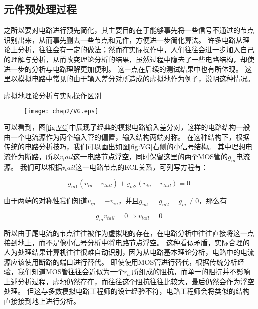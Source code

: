\subsection{元件预处理过程}
\label{subsec:simp:alg:pre}

之所以要对电路进行预先简化，其主要目的在于能够事先将一些信号不通过的节点识别出来，从而事先删去一些节点和元件，方便进一步简化算法。
许多电路从理论上分析，往往会有一定的做法；然而在实际操作中，人们往往会进一步加入自己的理解与分析，从而改变理论分析的结果，虽然过程中隐去了一些电路结构，却使进一步的分析与电路理解更加便利。
这一点在后续的测试结果中也有所体现。
这里以模拟电路中常见的由于输入差分对所造成的虚拟地作为例子，说明这种情况。

\begin{exmp}
虚拟地理论分析与实际操作区别

\begin{figure}[!htp]
	\centering
	\texttt{[image: chap2/VG.eps]}
\end{figure}

可以看到，图\ref{fig:VG}中展现了经典的模拟电路输入差分对，这样的电路结构一般由一个电流源作为两个输入管的偏置，输入结构两端对称。
在这种结构下，根据传统的电路分析技巧，我们可以画出如图\ref{fig:VG}右侧的小信号结构。
其中理想电流作为断路，所以$v_tail$这一电路节点浮空，同时保留这里的两个MOS管的$g_m$电流源。
我们可以根据$v_tail$这一电路节点的KCL关系，可列写方程有：

\begin{equation}
g_{m1}\left(v_{ip}-v_{tail}\right)+g_{m2}\left(v_{in}-v_{tail}\right)=0
\end{equation}

由于两端的对称性我们知道$v_{ip}=-v_{in}$，并且$g_{m1}=g_{m2}=g_m\neq0$，那么有

\begin{equation}
g_{m} v_{tail} = 0 \Rightarrow v_{tail} = 0
\end{equation}

所以由于尾电流的节点往往被作为虚拟地的存在，在电路分析中往往直接将这一点接到地上，而不是像小信号分析中将电路节点浮空。
这种看似矛盾，实际合理的人为处理结果计算机往往很难自动识别，因为从电路基本理论分析，电路中的电流源应该使用断路的端口进行替代。
即使使用MOS管进行替代，根据传统分析经验，我们知道MOS管往往会近似为一个$r_{ds}$所组成的阻抗，而单一的阻抗并不影响上述分析过程，虚地仍然存在，而往往这个阻抗往往比较大，最后仍然会作为浮空处理。
但这与多数模拟电路工程师的设计经验不符，电路工程师会将类似的结构直接接到地上进行分析。

\end{exmp}

